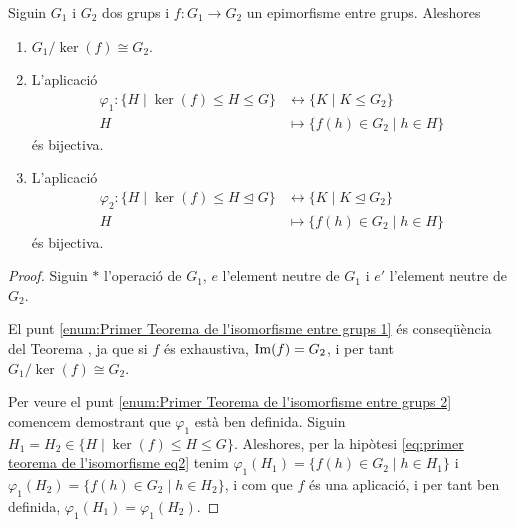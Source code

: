 \documentclass[../../Main.tex]{subfiles}
\begin{document}
	\begin{theorem}
		\label{thm:Primer Teorema de l'isomorfisme entre grups}
			Siguin \(G_{1}\) i \(G_{2}\) dos grups i \(f\colon G_{1}\to G_{2}\) un epimorfisme entre grups. Aleshores
		\begin{enumerate}
			\item\label{enum:Primer Teorema de l'isomorfisme entre grups 1} \(G_{1}/\ker(f)\cong G_{2}\).
			\item\label{enum:Primer Teorema de l'isomorfisme entre grups 2} L'aplicació
			\begin{align}
			\label{eq:primer teorema de l'isomorfisme eq2}
			\varphi_{1}\colon\{H\mid\ker(f)\leq H\leq G\}&\longleftrightarrow\{K\mid K\leq G_{2}\}\\
			H&\longmapsto\{f(h)\in G_{2}\mid h\in H\}\nonumber
			\end{align}
			és bijectiva.
			\item\label{enum:Primer Teorema de l'isomorfisme entre grups 3} L'aplicació
			\begin{align}
			\label{eq:primer teorema de l'isomorfisme eq3}
			\varphi_{2}\colon\{H\mid\ker(f)\leq H\trianglelefteq G\}&\longleftrightarrow\{K\mid K\trianglelefteq G_{2}\}\\
			H&\longmapsto\{f(h)\in G_{2}\mid h\in H\}\nonumber
			\end{align}
			és bijectiva.
		\end{enumerate}
		\begin{proof}
			Siguin \(\ast\) l'operació de \(G_{1}\), \(e\) l'element neutre de \(G_{1}\) i \(e'\) l'element neutre de \(G_{2}\).
			
			El punt \eqref{enum:Primer Teorema de l'isomorfisme entre grups 1} és conseqüència del Teorema , ja que si \(f\) és exhaustiva, \(\operatorname{Im}(f)=G_{2}\), i per tant \(G_{1}/\ker(f)\cong G_{2}\).
			
			Per veure el punt \eqref{enum:Primer Teorema de l'isomorfisme entre grups 2} comencem demostrant que \(\varphi_{1}\) està ben definida. Siguin \(H_{1}=H_{2}\in\{H\mid\ker(f)\leq H\leq G\}\). Aleshores, per la hipòtesi \eqref{eq:primer teorema de l'isomorfisme eq2} tenim \(\varphi_{1}(H_{1})=\{f(h)\in G_{2}\mid h\in H_{1}\}\) i \(\varphi_{1}(H_{2})=\{f(h)\in G_{2}\mid h\in H_{2}\}\), i com que \(f\) és una aplicació, i per tant ben definida, \(\varphi_{1}(H_{1})=\varphi_{1}(H_{2})\).
			

\end{proof}
\end{theorem}
\end{document}
